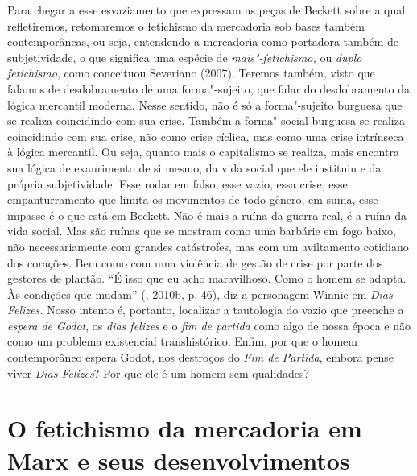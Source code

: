 Para chegar a esse esvaziamento que expressam as peças de Beckett sobre
a qual refletiremos, retomaremos o fetichismo da mercadoria sob bases
também contemporâneas, ou seja, entendendo a mercadoria como portadora
também de subjetividade, o que significa uma espécie de
\emph{mais"-fetichismo,} ou \emph{duplo fetichismo}, como conceituou
Severiano (2007). Teremos também, visto que falamos de
desdobramento de uma forma"-sujeito, que falar do desdobramento da lógica
mercantil moderna. Nesse sentido, não é só a forma"-sujeito burguesa que
se realiza coincidindo com sua crise. Também a forma"-social burguesa se
realiza coincidindo com sua crise, não como crise cíclica, mas como uma
crise intrínseca à lógica mercantil. Ou seja, quanto mais o capitalismo
se realiza, mais encontra sua lógica de exaurimento de si mesmo, da vida
social que ele instituiu e da própria subjetividade. Esse rodar em
falso, esse vazio, essa crise, esse empanturramento que limita os
movimentos de todo gênero, em suma, esse impasse é o que está em
Beckett. Não é mais a ruína da guerra real, é a ruína da vida social.
Mas são ruínas que se mostram como uma barbárie em fogo baixo, não
necessariamente com grandes catástrofes, mas com um aviltamento
cotidiano dos corações. Bem como com uma violência de gestão de crise
por parte dos gestores de plantão. ``É isso que eu acho maravilhoso.
Como o homem se adapta. Às condições que mudam'' (, 2010b, p.
46), diz a personagem Winnie em \emph{Dias Felizes.} Nosso intento é,
portanto, localizar a tautologia do vazio que preenche a \emph{espera de
Godot}, os \emph{dias felizes} e o \emph{fim de partida} como algo de
nossa época e não como um problema existencial transhistórico. Enfim,
por que o homem contemporâneo espera Godot, nos destroços do \emph{Fim
de Partida}, embora pense viver \emph{Dias Felizes}? Por que ele é um
homem sem qualidades?

\section*{O fetichismo da mercadoria em Marx e seus desenvolvimentos}

